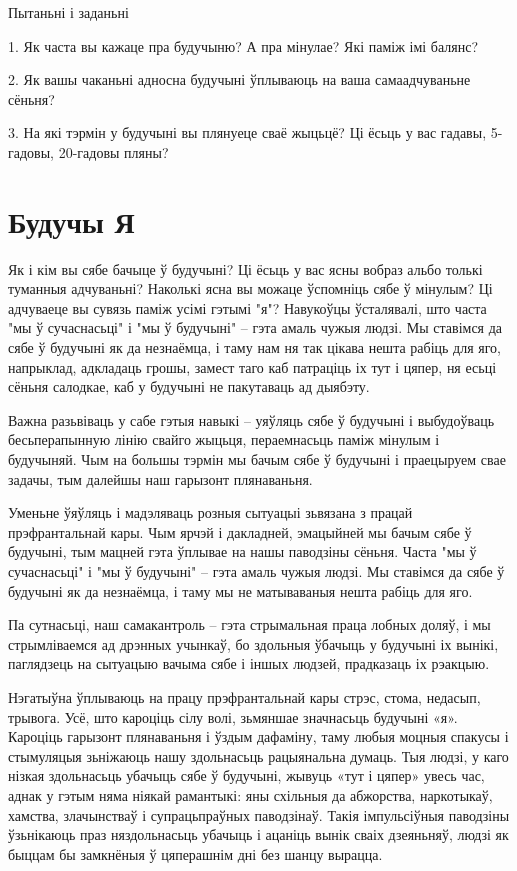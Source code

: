 Пытаньні і заданьні

1. Як часта вы кажаце пра будучыню? А пра мінулае? Які паміж імі балянс?

2. Як вашы чаканьні адносна будучыні ўплываюць на ваша самаадчуваньне сёньня?

3. На які тэрмін у будучыні вы плянуеце сваё жыцьцё? Ці ёсьць у вас гадавы, 5-гадовы, 20-гадовы пляны?


\section{Будучы Я}

Як і кім вы сябе бачыце ў будучыні? Ці ёсьць у вас ясны вобраз альбо толькі туманныя адчуваньні? Наколькі ясна вы можаце ўспомніць сябе ў мінулым? Ці адчуваеце вы сувязь паміж усімі гэтымі "я"? Навукоўцы ўсталявалі, што часта "мы ў сучаснасьці" і "мы ў будучыні" – гэта амаль чужыя людзі. Мы ставімся да сябе ў будучыні як да незнаёмца, і таму нам ня так цікава нешта рабіць для яго, напрыклад, адкладаць грошы, замест таго каб патраціць іх тут і цяпер, ня есьці сёньня салодкае, каб у будучыні не пакутаваць ад дыябэту.

Важна разьвіваць у сабе гэтыя навыкі – уяўляць сябе ў будучыні і выбудоўваць бесьперапынную лінію свайго жыцьця, пераемнасьць паміж мінулым і будучыняй. Чым на большы тэрмін мы бачым сябе ў будучыні і праецыруем свае задачы, тым далейшы наш гарызонт плянаваньня.

Уменьне ўяўляць і мадэляваць розныя сытуацыі зьвязана з працай прэфрантальнай кары. Чым ярчэй і дакладней, эмацыйней мы бачым сябе ў будучыні, тым мацней гэта ўплывае на нашы паводзіны сёньня. Часта "мы ў сучаснасьці" і "мы ў будучыні" – гэта амаль чужыя людзі. Мы ставімся да сябе ў будучыні як да незнаёмца, і таму мы не матываваныя нешта рабіць для яго.

Па сутнасьці, наш самакантроль – гэта стрымальная праца лобных доляў, і мы стрымліваемся ад дрэнных учынкаў, бо здольныя ўбачыць у будучыні іх вынікі, паглядзець на сытуацыю вачыма сябе і іншых людзей, прадказаць іх рэакцыю.

Нэгатыўна ўплываюць на працу прэфрантальнай кары стрэс, стома, недасып, трывога. Усё, што кароціць сілу волі, зьмяншае значнасьць будучыні «я». Кароціць гарызонт плянаваньня і ўздым дафаміну, таму любыя моцныя спакусы і стымуляцыя зьніжаюць нашу здольнасьць рацыянальна думаць. Тыя людзі, у каго нізкая здольнасьць убачыць сябе ў будучыні, жывуць «тут і цяпер» увесь час, аднак у гэтым няма ніякай рамантыкі: яны схільныя да абжорства, наркотыкаў, хамства, злачынстваў і супрацьпраўных паводзінаў. Такія імпульсіўныя паводзіны ўзьнікаюць праз няздольнасьць убачыць і ацаніць вынік сваіх дзеяньняў, людзі як быццам бы замкнёныя ў цяперашнім дні без шанцу вырацца.

